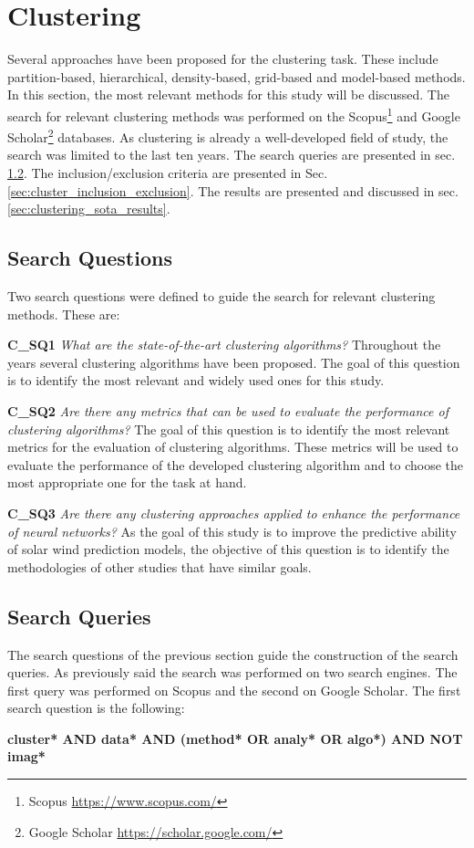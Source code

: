\section{Clustering}\label{sec:sota_clustering}
Several approaches have been proposed for the clustering task. These include partition-based, hierarchical, density-based, grid-based and model-based methods. In this section, the most relevant methods for this study will be discussed. The search for relevant clustering methods was performed on the Scopus\footnote{Scopus \url{https://www.scopus.com/}} and Google Scholar\footnote{Google Scholar \url{https://scholar.google.com/}} databases. As clustering is already a well-developed field of study, the search was limited to the last ten years. The search queries are presented in sec. \ref{sec:cluster_search_queries}. The inclusion/exclusion criteria are presented in Sec. \ref{sec:cluster_inclusion_exclusion}. The results are presented and discussed in sec. \ref{sec:clustering_sota_results}.

\subsection{Search Questions}\label{sec:cluster_search_questions}
Two search questions were defined to guide the search for relevant clustering methods. These are:

\noindent\textbf{C\_SQ1} \textit{What are the state-of-the-art clustering algorithms?} Throughout the years several clustering algorithms have been proposed. The goal of this question is to identify the most relevant and widely used ones for this study.

\noindent\textbf{C\_SQ2} \textit{Are there any metrics that can be used to evaluate the performance of clustering algorithms?} The goal of this question is to identify the most relevant metrics for the evaluation of clustering algorithms. These metrics will be used to evaluate the performance of the developed clustering algorithm and to choose the most appropriate one for the task at hand.

\noindent\textbf{C\_SQ3} \textit{Are there any clustering approaches applied to enhance the performance of neural networks?} As the goal of this study is to improve the predictive ability of solar wind prediction models, the objective of this question is to identify the methodologies of other studies that have similar goals.

\subsection{Search Queries}\label{sec:cluster_search_queries}
The search questions of the previous section guide the construction of the search queries. As previously said the search was performed on two search engines. The first query was performed on Scopus and the second on Google Scholar. The first search question is the following:
\begin{center}
    \textbf{cluster* AND data* AND (method* OR analy* OR algo*) AND NOT imag*}
\end{center}

